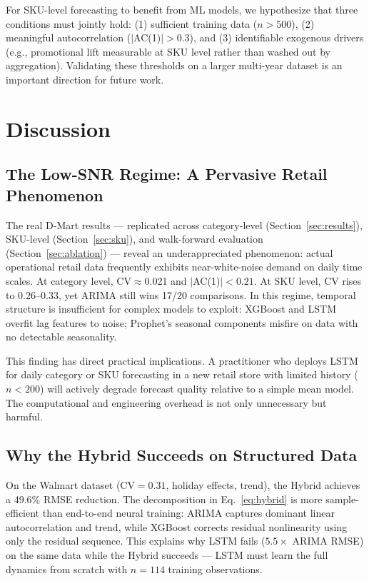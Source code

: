 \documentclass[journal]{IEEEtran}
\begin{document}
For SKU-level forecasting to benefit from ML models, we hypothesize that three conditions must jointly hold: (1) sufficient training data ($n > 500$), (2) meaningful autocorrelation ($|$AC(1)$| > 0.3$), and (3) identifiable exogenous drivers (e.g., promotional lift measurable at SKU level rather than washed out by aggregation). Validating these thresholds on a larger multi-year dataset is an important direction for future work.

\section{Discussion}
\label{sec:discussion}

\subsection{The Low-SNR Regime: A Pervasive Retail Phenomenon}

The real D-Mart results — replicated across category-level (Section~\ref{sec:results}), SKU-level (Section~\ref{sec:sku}), and walk-forward evaluation (Section~\ref{sec:ablation}) — reveal an underappreciated phenomenon: actual operational retail data frequently exhibits near-white-noise demand on daily time scales. At category level, CV$\approx$0.021 and $|$AC(1)$|<0.21$. At SKU level, CV rises to 0.26–0.33, yet ARIMA still wins 17/20 comparisons. In this regime, temporal structure is insufficient for complex models to exploit: XGBoost and LSTM overfit lag features to noise; Prophet's seasonal components misfire on data with no detectable seasonality.

This finding has direct practical implications. A practitioner who deploys LSTM for daily category or SKU forecasting in a new retail store with limited history ($n{<}200$) will actively degrade forecast quality relative to a simple mean model. The computational and engineering overhead is not only unnecessary but harmful.

\subsection{Why the Hybrid Succeeds on Structured Data}

On the Walmart dataset (CV$=0.31$, holiday effects, trend), the Hybrid achieves a 49.6\% RMSE reduction. The decomposition in Eq.~\ref{eq:hybrid} is more sample-efficient than end-to-end neural training: ARIMA captures dominant linear autocorrelation and trend, while XGBoost corrects residual nonlinearity using only the residual sequence. This explains why LSTM fails ($5.5\times$ ARIMA RMSE) on the same data while the Hybrid succeeds — LSTM must learn the full dynamics from scratch with $n{=}114$ training observations.
\end{document}
